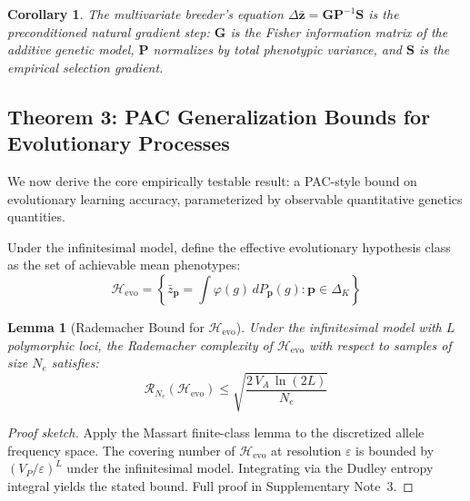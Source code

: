 \documentclass[12pt]{article}
\newtheorem{lemma}[theorem]{Lemma}
\newtheorem{corollary}[theorem]{Corollary}
\theoremstyle{remark}
\begin{document}
\begin{corollary}
The multivariate breeder's equation $\Delta\bar{\mathbf{z}} = \mathbf{G}\mathbf{P}^{-1}\mathbf{S}$ is the preconditioned natural gradient step: $\mathbf{G}$ is the Fisher information matrix of the additive genetic model, $\mathbf{P}$ normalizes by total phenotypic variance, and $\mathbf{S}$ is the empirical selection gradient.
\end{corollary}

\subsection{Theorem 3: PAC Generalization Bounds for Evolutionary Processes}

We now derive the core empirically testable result: a PAC-style bound on evolutionary learning accuracy, parameterized by observable quantitative genetics quantities.

Under the infinitesimal model, define the effective evolutionary hypothesis class as the set of achievable mean phenotypes:
\[
  \mathcal{H}_{\mathrm{evo}} = \left\{\bar{z}_\mathbf{p} = \int \varphi(g)\, dP_\mathbf{p}(g) : \mathbf{p} \in \Delta_K\right\}
\]

\begin{lemma}[Rademacher Bound for $\mathcal{H}_{\mathrm{evo}}$]
Under the infinitesimal model with $L$ polymorphic loci, the Rademacher complexity of $\mathcal{H}_{\mathrm{evo}}$ with respect to samples of size $N_e$ satisfies:
\[
  \mathcal{R}_{N_e}(\mathcal{H}_{\mathrm{evo}}) \leq \sqrt{\frac{2\,V_A\,\ln(2L)}{N_e}}
\]
\end{lemma}

\begin{proof}[Proof sketch]
Apply the Massart finite-class lemma to the discretized allele frequency space. The covering number of $\mathcal{H}_{\mathrm{evo}}$ at resolution $\varepsilon$ is bounded by $(V_P/\varepsilon)^L$ under the infinitesimal model. Integrating via the Dudley entropy integral yields the stated bound. Full proof in Supplementary Note~3.
\end{proof}
\end{document}
